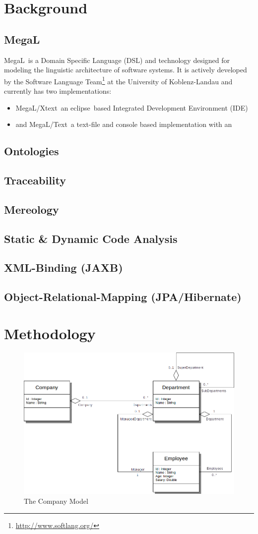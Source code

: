 \documentclass[runningheads,a4paper]{llncs}
\newcommand{\megal}{\textsf{MegaL}~}
\newcommand{\megalxtext}{\textsf{MegaL/Xtext}~}
\newcommand{\megaltext}{\textsf{MegaL/Text}~}
\newcommand{\eclipse}{\textsf{eclipse}~}
\begin{document}
\section{Background}
\label{section:Background}

\subsection{\megal}
\megal is a Domain Specific Language (DSL) and technology designed  for modeling the linguistic architecture of software systems.
It is actively developed by the Software Language Team\footnote{\url{http://www.softlang.org/}} at the University of Koblenz-Landau and currently has two implementations: 
\begin{itemize}
\item
\megalxtext an \eclipse based Integrated Development Environment (IDE)
\item
and \megaltext a text-file and console based implementation with an 
\end{itemize}
\subsection{Ontologies}
\subsection{Traceability}
\subsection{Mereology}
\subsection{Static \& Dynamic Code Analysis}
\subsection{XML-Binding (JAXB)}
\subsection{Object-Relational-Mapping (JPA/Hibernate)}

\section{Methodology}
\label{section:Methodology}


\begin{figure}
\label{figure:TheCompanyModel}
\centering
\includegraphics[width=.6\textwidth]{companies.png}
\caption{The Company Model}
\end{figure}
\end{document}
